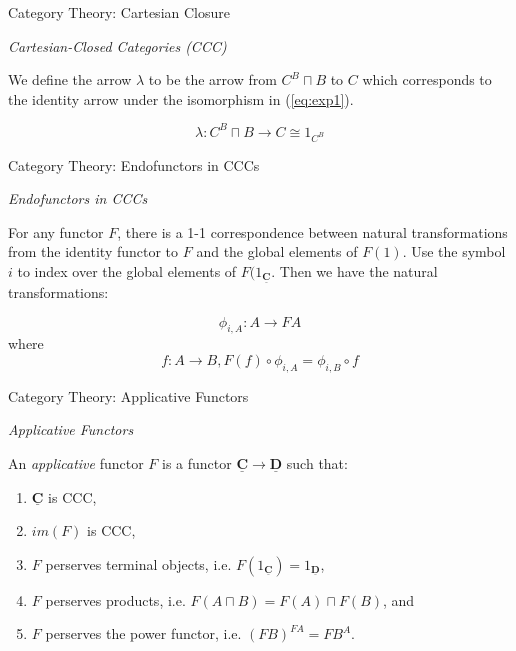 \documentclass[10pt]{beamer}
\newcommand{\Cat}[1]{\ensuremath{\underline{\mathbf{#1}}}}
\newcommand{\Com}[3]{#3^{#2}}
\newcommand{\eqnref}[1]{(\ref{eq:#1})}
\theoremstyle{definition}
\theoremstyle{remark}
\numberwithin{equation}{section}
\begin{document}
\begin{frame}[fragile]{Category Theory: Cartesian Closure}

  \emph{Cartesian-Closed Categories (CCC)}

  We define the arrow $\lambda$ to be the arrow from $\Com{C}{B}{C}\sqcap B$ to $C$ which corresponds to the identity arrow under the isomorphism in \eqnref{exp1}.

  \[
  \lambda : \Com{C}{B}{C}\sqcap B \rightarrow C \cong 1_{\Com{C}{B}{C}}
  \]

\end{frame}

\begin{frame}[fragile]{Category Theory: Endofunctors in CCCs}

  \emph{Endofunctors in CCCs}

  For any functor $F$, there is a 1-1 correspondence between natural transformations from the identity functor to $F$ and the global elements of $F(1)$. Use the symbol $i$ to index over the global elements of $F(1_{\Cat{C}}$. Then we have the natural transformations:
  
  \[
  \phi_{i,A} : A \rightarrow F A
  \]
  where
  \[
  f : A \rightarrow B, F(f) \circ \phi_{i,A} = \phi_{i,B} \circ f
  \]

\end{frame}

\begin{frame}[fragile]{Category Theory: Applicative Functors}

  \emph{Applicative Functors}

  An \emph{applicative} functor $F$ is a functor $\Cat{C}\rightarrow \Cat{D}$ such that:
  \begin{enumerate}
    \item $\Cat{C}$ is CCC,
    \item $im(F)$ is CCC,
    \item $F$ perserves terminal objects, i.e. $F(1_{\Cat{C}})=1_{\Cat{D}}$,
    \item $F$ perserves products, i.e. $F(A\sqcap B)=F(A)\sqcap F(B)$, and
    \item $F$ perserves the power functor, i.e. $\Com{D}{F A}{(F B)} = F \Com{C}{A}{B}$.
  \end{enumerate}

\end{frame}
\end{document}
